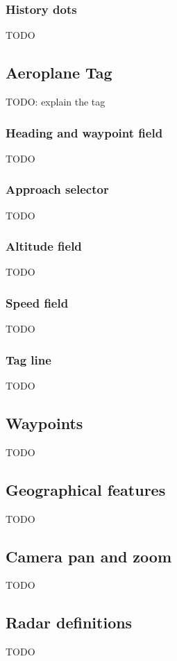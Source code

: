 \documentclass{article}
\begin{document}
\subsubsection{History dots}
TODO


\subsection{Aeroplane Tag}
TODO: explain the tag


\subsubsection{Heading and waypoint field}
TODO


\subsubsection{Approach selector}
TODO


\subsubsection{Altitude field}
TODO


\subsubsection{Speed field}
TODO


\subsubsection{Tag line}
TODO


\subsection{Waypoints}
TODO


\subsection{Geographical features}
TODO


\subsection{Camera pan and zoom}
TODO


\subsection{Radar definitions}
TODO
\end{document}

